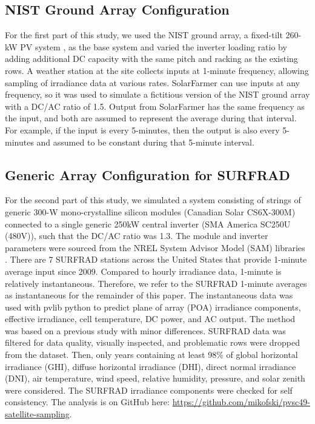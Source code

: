 \documentclass[conference]{IEEEtran}
\begin{document}
\subsection{NIST Ground Array Configuration}
For the first part of this study, we used the NIST ground array, a fixed-tilt 260-kW PV system \cite{Boyd2017,Boyd2017a,Boyd2017b}, as the base system and varied the inverter loading ratio by adding additional DC capacity with the same pitch and racking as the existing rows. A weather station at the site collects inputs at 1-minute frequency, allowing sampling of irradiance data at various rates. SolarFarmer \cite{solarfarmer2018} can use inputs at any frequency, so it was used to simulate a fictitious version of the NIST ground array with a DC/AC ratio of 1.5. Output from SolarFarmer has the same frequency as the input, and both are assumed to represent the average during that interval. For example, if the input is every 5-minutes, then the output is also every 5-minutes and assumed to be constant during that 5-minute interval.

\subsection{Generic Array Configuration for SURFRAD}
For the second part of this study, we simulated a system consisting of strings of generic 300-W mono-crystalline silicon modules (Canadian Solar CS6X-300M) connected to a single generic 250kW central inverter (SMA America SC250U (480V)), such that the DC/AC ratio was 1.3. The module and inverter parameters were sourced from the NREL System Advisor Model (SAM) libraries \cite{Freeman2018}. There are 7 SURFRAD \cite{Augustine2000} stations across the United States that provide 1-minute average input since 2009. Compared to hourly irradiance data, 1-minute is relatively instantaneous. Therefore, we refer to the SURFRAD 1-minute averages as instantaneous for the remainder of this paper. The instantaneous data was used with pvlib python \cite{pvlib2018} to predict plane of array (POA) irradiance components, effective irradiance, cell temperature, DC power, and AC output. The method was based on a previous study \cite{9519024} with minor differences. SURFRAD data was filtered for data quality, visually inspected, and problematic rows were dropped from the dataset. Then, only years containing at least 98\% of global horizontal irradiance (GHI), diffuse horizontal irradiance (DHI), direct normal irradiance (DNI), air temperature, wind speed, relative humidity, pressure, and solar zenith were considered. The SURFRAD irradiance components were checked for self consistency. The analysis is on GitHub here: \url{https://github.com/mikofski/pvsc49-satellite-sampling}.
\end{document}
